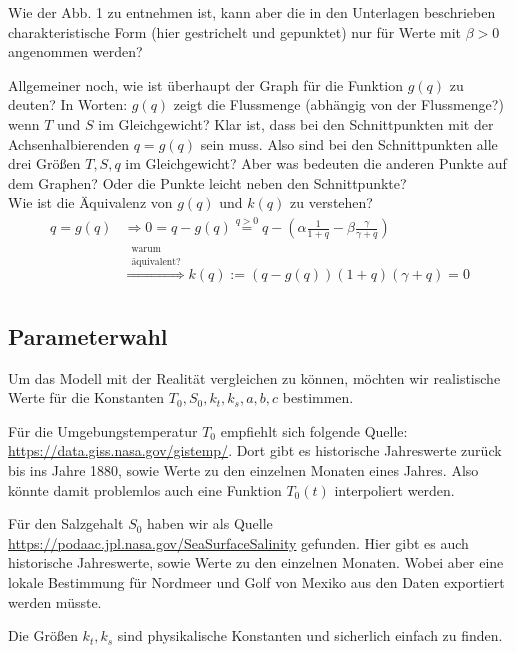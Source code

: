 \documentclass[11pt,a4paper]{article}
\begin{document}
	Wie der Abb. 1 zu entnehmen ist, kann aber die in den Unterlagen beschrieben charakteristische Form (hier gestrichelt und gepunktet) nur für Werte mit \(\beta > 0\) angenommen werden?
	
	Allgemeiner noch, wie ist überhaupt der Graph für die Funktion \(g(q)\) zu deuten? In Worten: \(g(q)\) zeigt die Flussmenge (abhängig von der Flussmenge?) wenn \(T\) und \(S\) im Gleichgewicht?  Klar ist, dass bei den Schnittpunkten mit der Achsenhalbierenden \(q = g(q)\) sein muss. Also sind bei den Schnittpunkten alle drei Größen \(T,S,q\) im Gleichgewicht? Aber was bedeuten die anderen Punkte auf dem Graphen? Oder die Punkte leicht neben den Schnittpunkte? \\
	
	Wie ist die Äquivalenz von \(g(q)\) und \(k(q)\) zu verstehen?
	\begin{align*}
		q = g(q) &\Rightarrow 0 = q - g(q) \stackrel{q > 0}{=}  q - \left(\alpha \frac{1}{1+q} - \beta \frac{\gamma}{\gamma + q} \right) \\
		& \stackrel{\substack{\textrm{warum}\\\textrm{äquivalent?}}}{\Rightarrow}
		k(q) := \left( q - g(q) \right) (1+q) (\gamma + q) = 0 \\
	\end{align*}
	
	
	\subsection*{Parameterwahl}
	
	Um das Modell mit der Realität vergleichen zu können, möchten wir realistische Werte für die Konstanten \( T_0, S_0, k_t, k_s,  a, b, c\) bestimmen.
	
	Für die Umgebungstemperatur \(T_0\) empfiehlt sich folgende Quelle: \url{https://data.giss.nasa.gov/gistemp/}. Dort gibt es historische Jahreswerte zurück bis ins Jahre 1880, sowie Werte zu den einzelnen Monaten eines Jahres. Also könnte damit problemlos auch eine Funktion \(T_0(t)\) interpoliert werden.
	
	Für den Salzgehalt \(S_0\) haben wir als Quelle \url{https://podaac.jpl.nasa.gov/SeaSurfaceSalinity} gefunden. Hier gibt es auch historische Jahreswerte, sowie Werte zu den einzelnen Monaten. Wobei aber eine lokale Bestimmung für Nordmeer und Golf von Mexiko aus den Daten exportiert werden müsste.
	
	Die Größen \(k_t, k_s\) sind physikalische Konstanten und sicherlich einfach zu finden.
	
\end{document}
